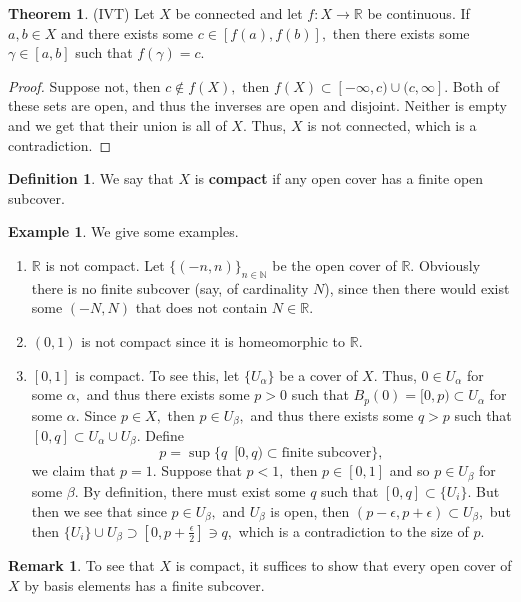 \documentclass[10pt, oneside]{article}
\newcommand{\bbR}{\mathbb{R}}
\newcommand{\bbN}{\mathbb{N}}
\theoremstyle{definition}
\newtheorem{exmp}{Example}[section]
\newtheorem{thm}{Theorem}
\newtheorem{defn}{Definition}
\newtheorem{rem}{Remark}
\begin{document}
\begin{thm}
    (IVT) Let $X$ be connected and let $f: X\to \bbR$ be continuous. If $a,b \in X$ and there exists some $c\in [f(a), f(b)],$ then there exists some $\gamma \in [a,b]$ such that $f(\gamma) = c.$
\end{thm}
\begin{proof}
    Suppose not, then $c \notin f(X),$ then $f(X)\subset [-\infty, c) \cup (c, \infty].$ Both of these sets are open, and thus the inverses are open and disjoint. Neither is empty and we get that their union is all of $X.$ Thus, $X$ is not connected, which is a contradiction.
\end{proof}

\begin{defn}
    We say that $X$ is \textbf{compact} if any open cover has a finite open subcover.
\end{defn}
\begin{exmp}
We give some examples.
    \begin{enumerate}
        \item $\bbR$ is not compact. Let $\{(-n, n)\}_{n\in \bbN}$ be the open cover of $\bbR.$ Obviously there is no finite subcover (say, of cardinality $N$), since then there would exist some $(-N, N)$ that does not contain $N \in \bbR.$
        \item $(0,1)$ is not compact since it is homeomorphic to $\bbR.$
        \item $[0,1]$ is compact. To see this, let $\{U_\alpha\}$ be a cover of $X.$ Thus, $0 \in U_\alpha$ for some $\alpha,$ and thus there exists some $p>0$ such that $B_p(0) = [0,p)\subset U_\alpha$ for some $\alpha.$ Since $p\in X,$ then $p\in U_\beta,$ and thus there exists some $q>p$ such that $[0,q]\subset U_\alpha \cup U_\beta.$ Define 
        \[p = \sup\{q \; \: [0,q) \subset \text{finite subcover}\},\] we claim that $p = 1.$ Suppose that $p<1,$ then $p\in [0,1]$ and so $p\in U_\beta$ for some $\beta.$ By definition, there must exist some $q$ such that $[0,q]\subset \{U_i\}.$ But then we see that since $p\in U_\beta,$ and $U_\beta$ is open, then $(p-\epsilon, p+\epsilon)\subset U_\beta,$ but then $\{U_i\} \cup U_\beta \supset [0, p + \frac{\epsilon}{2}] \ni q,$ which is a contradiction to the size of $p.$  
    \end{enumerate}
\end{exmp}

\begin{rem}
    To see that $X$ is compact, it suffices to show that every open cover of $X$ by basis elements has a finite subcover.
\end{rem}
\end{document}
